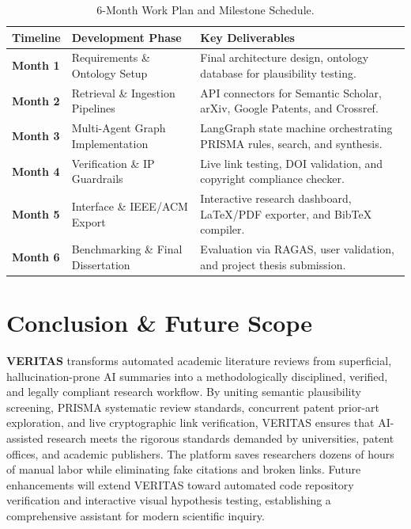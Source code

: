 \documentclass[11pt,a4paper]{article}
\begin{document}
\begin{table}[htbp]
\centering
\small
\begin{tabularx}{\textwidth}{l p{4.2cm} X}
\toprule
\textbf{Timeline} & \textbf{Development Phase} & \textbf{Key Deliverables} \\
\midrule
\textbf{Month 1} & Requirements \& Ontology Setup & Final architecture design, ontology database for plausibility testing. \\
\textbf{Month 2} & Retrieval \& Ingestion Pipelines & API connectors for Semantic Scholar, arXiv, Google Patents, and Crossref. \\
\textbf{Month 3} & Multi-Agent Graph Implementation & LangGraph state machine orchestrating PRISMA rules, search, and synthesis. \\
\textbf{Month 4} & Verification \& IP Guardrails & Live link testing, DOI validation, and copyright compliance checker. \\
\textbf{Month 5} & Interface \& IEEE/ACM Export & Interactive research dashboard, LaTeX/PDF exporter, and BibTeX compiler. \\
\textbf{Month 6} & Benchmarking \& Final Dissertation & Evaluation via RAGAS, user validation, and project thesis submission. \\
\bottomrule
\end{tabularx}
\caption{6-Month Work Plan and Milestone Schedule.}
\label{tab:milestones}
\end{table}

\section{Conclusion \& Future Scope}
\textbf{VERITAS} transforms automated academic literature reviews from superficial, hallucination-prone AI summaries into a methodologically disciplined, verified, and legally compliant research workflow. By uniting semantic plausibility screening, PRISMA systematic review standards, concurrent patent prior-art exploration, and live cryptographic link verification, VERITAS ensures that AI-assisted research meets the rigorous standards demanded by universities, patent offices, and academic publishers. The platform saves researchers dozens of hours of manual labor while eliminating fake citations and broken links. Future enhancements will extend VERITAS toward automated code repository verification and interactive visual hypothesis testing, establishing a comprehensive assistant for modern scientific inquiry.
\end{document}
